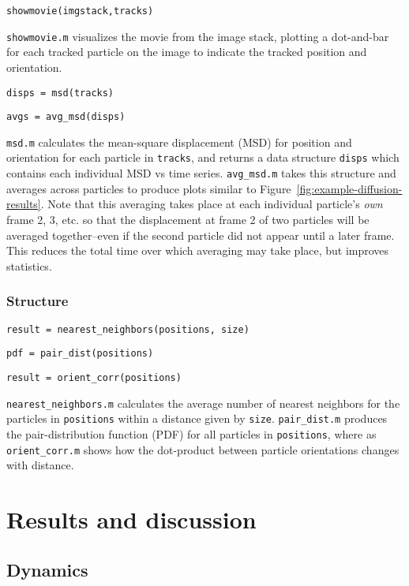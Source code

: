 \texttt{showmovie(imgstack,tracks)}

\texttt{showmovie.m} visualizes the
movie from the image stack, plotting a dot-and-bar for each tracked particle on the image to indicate 
the tracked position and orientation.

\texttt{disps = msd(tracks)}

\texttt{avgs = avg\_msd(disps)}

\texttt{msd.m} calculates the mean-square displacement (MSD) for position and orientation for each particle 
in \texttt{tracks}, and returns a data structure \texttt{disps} which contains each individual MSD vs time 
series.  \texttt{avg\_msd.m} takes this structure and averages across particles to produce plots similar 
to Figure~\ref{fig:example-diffusion-results}. Note that this averaging takes place at each 
individual particle's \textit{own} frame 2, 3, etc. so that the displacement at frame 2 of two particles 
will be averaged together--even if the second particle did not appear until a later frame.  This reduces the
total time over which averaging may take place, but improves statistics.

\subsubsection{Structure}
\label{sec:structure-calcs}

\texttt{result = nearest\_neighbors(positions, size)}

\texttt{pdf = pair\_dist(positions)}

\texttt{result = orient\_corr(positions)}

\texttt{nearest\_neighbors.m} calculates the average number of nearest neighbors for the particles in 
\texttt{positions} within a distance given by \texttt{size}. \texttt{pair\_dist.m} produces the pair-distribution
function (PDF) for all particles in \texttt{positions}, where as \texttt{orient\_corr.m} shows how the 
dot-product between particle orientations changes with distance.

\section{Results and discussion}

\subsection{Dynamics}

